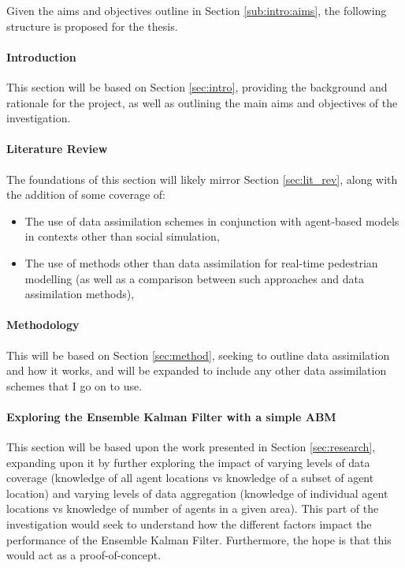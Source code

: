 Given the aims and objectives outline in Section \ref{sub:intro:aims}, the
following structure is proposed for the thesis.

\paragraph{Introduction}

This section will be based on Section \ref{sec:intro}, providing the background
and rationale for the project, as well as outlining the main aims and objectives
of the investigation.


\paragraph{Literature Review}

The foundations of this section will likely mirror Section \ref{sec:lit_rev},
along with the addition of some coverage of:
\begin{itemize}
    \item The use of data assimilation schemes in conjunction with
        agent-based models in contexts other than social simulation,
    \item The use of methods other than data assimilation for real-time
        pedestrian modelling (as well as a comparison between such
        approaches and data assimilation methods),
\end{itemize}

\paragraph{Methodology}

This will be based on Section \ref{sec:method}, seeking to outline data
assimilation and how it works, and will be expanded to include any other data
assimilation schemes that I go on to use.

\paragraph{Exploring the Ensemble Kalman Filter with a simple ABM}

This section will be based upon the work presented in Section
\ref{sec:research}, expanding upon it by further exploring the impact of varying
levels of data coverage (knowledge of all agent locations vs knowledge of a
subset of agent location) and varying levels of data aggregation (knowledge of
individual agent locations vs knowledge of number of agents in a given area).
This part of the investigation would seek to understand how the different
factors impact the performance of the Ensemble Kalman Filter.
Furthermore, the hope is that this would act as a proof-of-concept.

